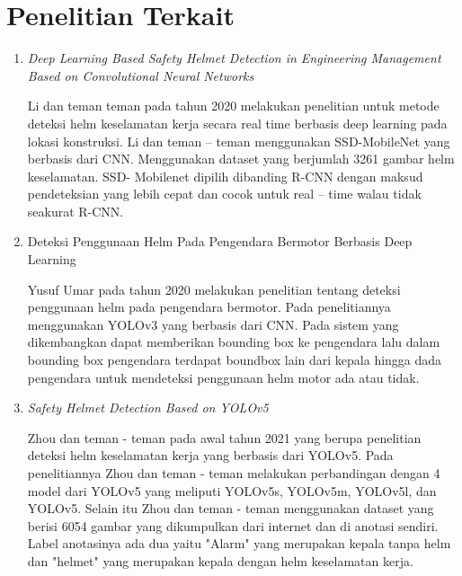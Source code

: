 \section{Penelitian Terkait}
\begin{enumerate}
  \item \emph{Deep Learning Based Safety Helmet Detection in Engineering Management Based on Convolutional Neural Networks}
  \par Li dan teman teman pada tahun 2020 melakukan penelitian untuk metode deteksi helm keselamatan kerja secara real time berbasis deep learning pada lokasi konstruksi. Li dan teman – teman menggunakan SSD-MobileNet yang berbasis dari CNN. Menggunakan dataset yang berjumlah 3261 gambar helm keselamatan. SSD- Mobilenet dipilih dibanding R-CNN dengan maksud pendeteksian yang lebih cepat dan cocok untuk real – time walau tidak seakurat R-CNN. \cite{li2020deep}
  
  \item Deteksi Penggunaan Helm Pada Pengendara Bermotor Berbasis Deep Learning
  \par Yusuf Umar pada tahun 2020 melakukan penelitian tentang deteksi penggunaan helm pada pengendara bermotor. Pada penelitiannya menggunakan YOLOv3 yang berbasis dari CNN. Pada sistem yang dikembangkan dapat memberikan bounding box ke pengendara lalu dalam bounding box pengendara terdapat boundbox lain dari kepala hingga dada pengendara untuk mendeteksi penggunaan helm motor ada atau tidak. \cite{hanafi2020deteksi}

  \item \emph{Safety Helmet Detection Based on YOLOv5}
  \par Zhou dan teman - teman pada awal tahun 2021 yang berupa penelitian deteksi helm keselamatan kerja yang berbasis dari YOLOv5. Pada penelitiannya Zhou dan teman - teman melakukan perbandingan dengan 4 model dari YOLOv5 yang meliputi YOLOv5s, YOLOv5m, YOLOv5l, dan YOLOv5. Selain itu Zhou dan teman - teman menggunakan dataset yang berisi 6054 gambar yang dikumpulkan dari
  internet dan di anotasi sendiri. Label anotasinya ada dua yaitu "Alarm" yang merupakan kepala tanpa helm dan
  "helmet" yang merupakan kepala dengan helm keselamatan kerja\cite{zhou_zhao_nie_2021}.
\end{enumerate}

